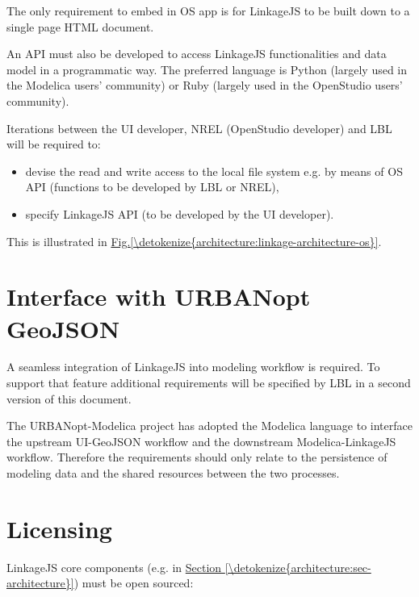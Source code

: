 \documentclass[letterpaper,10pt, openany,english]{sphinxmanual}
\begin{document}
The only requirement to embed in OS app is for LinkageJS to be built down to a single page HTML document.

An API must also be developed to access LinkageJS functionalities and data model in a programmatic way. The preferred language is Python (largely used in the Modelica users’ community) or Ruby (largely used in the OpenStudio users’ community).

Iterations between the UI developer, NREL (OpenStudio developer) and LBL will be required to:
\begin{itemize}
\item {} 
devise the read and write access to the local file system e.g. by means of OS API (functions to be developed by LBL or NREL),

\item {} 
specify LinkageJS API (to be developed by the UI developer).

\end{itemize}

This is illustrated in \hyperref[\detokenize{architecture:linkage-architecture-os}]{Fig.\@ \ref{\detokenize{architecture:linkage-architecture-os}}}.


\section{Interface with URBANopt GeoJSON}
\label{\detokenize{requirements:interface-with-urbanopt-geojson}}
A seamless integration of LinkageJS into  modeling workflow is required. To support that feature additional requirements will be specified by LBL in a second version of this document.

The URBANopt-Modelica project has adopted the Modelica language to interface the upstream UI-GeoJSON workflow and the downstream Modelica-LinkageJS workflow. Therefore the requirements should only relate to the persistence of modeling data and the shared resources between the two processes.


\section{Licensing}
\label{\detokenize{requirements:licensing}}
LinkageJS core components (e.g.  in \hyperref[\detokenize{architecture:sec-architecture}]{Section \ref{\detokenize{architecture:sec-architecture}}}) must be open sourced: 
\end{document}
